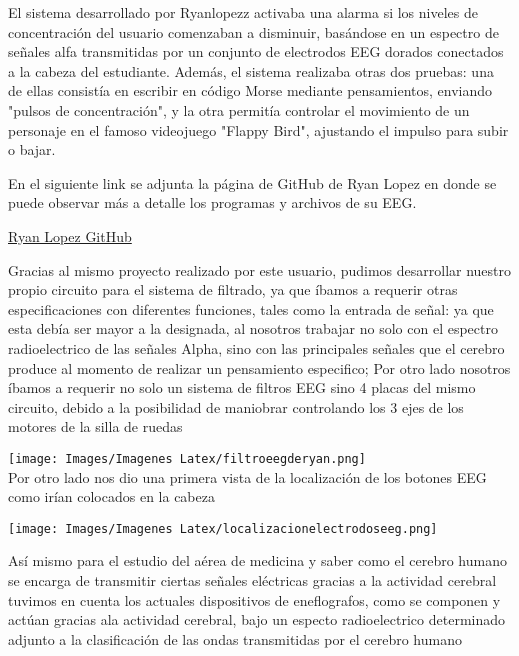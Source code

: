 \documentclass{article}
\begin{document}
El sistema desarrollado por Ryanlopezz activaba una alarma si los niveles de concentración del usuario comenzaban a disminuir, basándose en un espectro de señales alfa transmitidas por un conjunto de electrodos EEG dorados conectados a la cabeza del estudiante. Además, el sistema realizaba otras dos pruebas: una de ellas consistía en escribir en código Morse mediante pensamientos, enviando "pulsos de concentración", y la otra permitía controlar el movimiento de un personaje en el famoso videojuego "Flappy Bird", ajustando el impulso para subir o bajar.

En el siguiente link se adjunta la página de GitHub de Ryan Lopez en donde se puede observar más a detalle los programas y archivos de su EEG.


\begin{center}
    \href{https://github.com/ryanlopezzzz/EEG}{Ryan Lopez GitHub}
\end{center}


Gracias al mismo proyecto realizado por este usuario, pudimos desarrollar nuestro propio circuito para el sistema de filtrado, ya que íbamos a requerir otras especificaciones con diferentes funciones, tales como la entrada de señal: ya que esta debía ser mayor a la designada, al nosotros trabajar no solo con el espectro radioelectrico de las señales Alpha, sino con las principales señales que el cerebro produce al momento de realizar un pensamiento especifico; Por otro lado nosotros íbamos a requerir no solo un sistema de filtros EEG sino 4 placas del mismo circuito, debido a la posibilidad de maniobrar controlando los 3 ejes de los motores de la silla de ruedas


\begin{center}
    \texttt{[image: Images/Imagenes Latex/filtroeegderyan.png]}\\
    
Por otro lado nos dio una primera vista de la localización de los botones EEG como irían colocados en la cabeza

\end{center}

\begin{center}
    \texttt{[image: Images/Imagenes Latex/localizacionelectrodoseeg.png]}\\

\end{center}

Así mismo para el estudio del aérea de medicina y saber como el cerebro humano se encarga de transmitir ciertas señales eléctricas gracias a la actividad cerebral  tuvimos en cuenta los actuales dispositivos de eneflografos, como se componen y actúan gracias ala actividad cerebral, bajo un especto radioelectrico determinado adjunto a la clasificación de las ondas transmitidas por el cerebro humano
\end{document}
